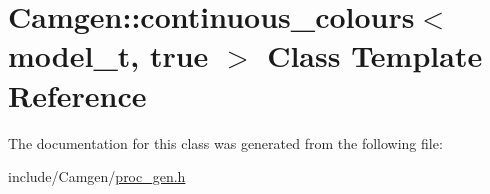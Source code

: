 \hypertarget{a00105}{}\section{Camgen\+:\+:continuous\+\_\+colours$<$ model\+\_\+t, true $>$ Class Template Reference}
\label{a00105}


The documentation for this class was generated from the following file\+:\begin{DoxyCompactItemize}
\item 
include/\+Camgen/\hyperlink{a00730}{proc\+\_\+gen.\+h}\end{DoxyCompactItemize}
